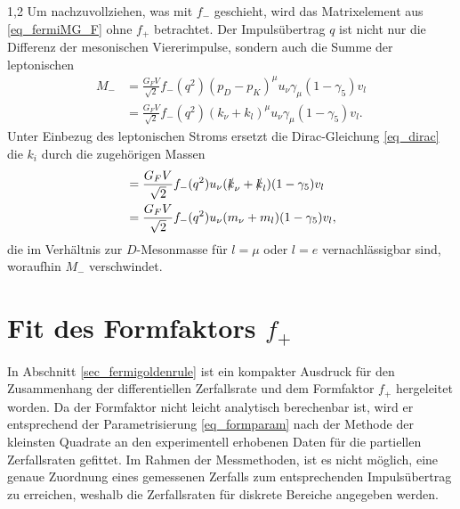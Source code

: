 \documentclass[11pt,a4paper,twoside,draft]{report}
\begin{document}
\begin{spacing}{1,2}
\noindent
Um nachzuvollziehen, was mit $f_-$ geschieht, wird das Matrixelement aus \eqref{eq_fermiMG_F} ohne $f_+$ betrachtet. Der Impulsübertrag $q$ ist nicht
nur die Differenz der mesonischen Viererimpulse, sondern auch die Summe der leptonischen
\begin{align}
 M_- &= \frac{G_F V}{\sqrt{2}} f_-(q^2)(p_D-p_K)^\mu u_\nu \gamma_\mu(1-\gamma_5)v_l\nonumber\\
 &= \frac{G_F V}{\sqrt{2}} f_-(q^2)(k_\nu+k_l)^\mu u_\nu \gamma_\mu(1-\gamma_5)v_l.\nonumber
\end{align}
Unter Einbezug des leptonischen Stroms ersetzt die Dirac-Gleichung \eqref{eq_dirac} die $k_i$ durch die zugehörigen Massen
\begin{align}
 &=\frac{G_F V}{\sqrt{2}} f_-(q^2)u_\nu (\slashed{k}_\nu + \slashed{k}_l) (1-\gamma_5)v_l\nonumber\\
 &=\frac{G_F V}{\sqrt{2}} f_-(q^2)u_\nu (m_\nu + m_l) (1-\gamma_5)v_l,\nonumber 
 \end{align}
die im Verhältnis zur $D$-Mesonmasse für $l=\mu$ oder $l=e$ vernachlässigbar sind, woraufhin $M_-$ verschwindet.

\section{Fit des Formfaktors $f_+$}
In Abschnitt \ref{sec_fermigoldenrule} ist ein kompakter Ausdruck für den Zusammenhang der differentiellen Zerfallsrate und dem 
Formfaktor $f_+$ hergeleitet worden. Da der Formfaktor nicht leicht analytisch berechenbar ist, wird er entsprechend der Parametrisierung \eqref{eq_formparam}
nach der Methode der kleinsten Quadrate an den experimentell erhobenen Daten für die partiellen Zerfallsraten gefittet. Im Rahmen der Messmethoden, ist es
nicht möglich, eine genaue Zuordnung eines gemessenen Zerfalls zum entsprechenden Impulsübertrag zu erreichen, weshalb die Zerfallsraten für diskrete Bereiche
angegeben werden. 


\end{spacing}
\end{document}
